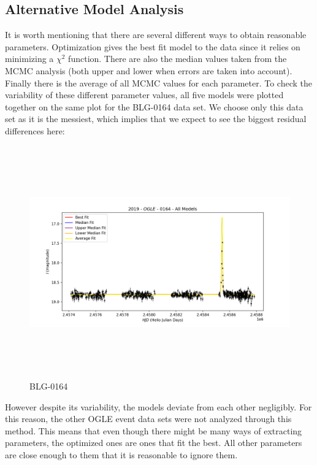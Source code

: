 \documentclass{article}
\begin{document}
\subsection{Alternative Model Analysis}
It is worth mentioning that there are several different ways to obtain reasonable parameters. Optimization gives the best fit model to the data since it relies on minimizing a $\chi^2$ function. There are also the median values taken from the MCMC analysis (both upper and lower when errors are taken into account). Finally there is the average of all MCMC values for each parameter. To check the variability of these different parameter values, all five models were plotted together on the same plot for the BLG-0164 data set. We choose only this data set as it is the messiest, which implies that we expect to see the biggest residual differences here:
        \begin{figure}[H]
            \includegraphics[width=1\linewidth, height=10cm]{Images/2019-BLG-0164_All Models .png}
            \caption{BLG-0164}
            \label{fig:Sub-Event-One-Main}
        \end{figure}

However despite its variability, the models deviate from each other negligibly. For this reason, the other OGLE event data sets were not analyzed through this method. This means that even though there might be many ways of extracting parameters, the optimized ones are ones that fit the best. All other parameters are close enough to them that it is reasonable to ignore them.
\end{document}
